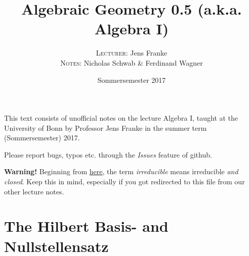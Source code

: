 \documentclass[a4paper,parskip=half,numbers=enddot, DIV=12]{scrreprt}
\title{Algebraic Geometry 0.5 (a.k.a. Algebra I)}
\author{\textsc{Lecturer:} Jens Franke\\
	\textsc{Notes:} Nicholas Schwab \& Ferdinand Wagner}
\date{Sommersemester 2017}
\begin{document}
	\maketitle
	
	\thispagestyle{plain}
	This text consists of unofficial notes on the lecture Algebra I, taught at the University of Bonn by Professor Jens Franke in the summer term (Sommersemester) 2017. 
	
	Please report bugs, typos etc. through the \emph{Issues} feature of github.
	
	\textbf{Warning!} Beginning from \hyperref[rem:irreducibleNotation]{here}, the term \emph{irreducible} means irreducible \emph{and closed}. Keep this in mind, especially if you got redirected to this file from our other lecture notes.
	
	\tableofcontents
	
	
	\chapter{The Hilbert Basis- and Nullstellensatz}
\end{document}
